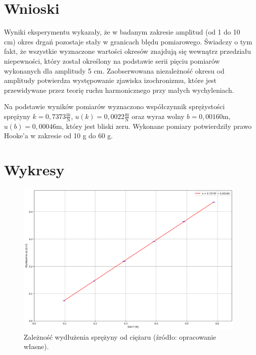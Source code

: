 \documentclass[a4paper,12pt]{article}
\begin{document}
\section{Wnioski}

Wyniki eksperymentu wykazały, że w badanym zakresie amplitud (od 1 do 10 cm) okres drgań pozostaje stały w granicach błędu pomiarowego. Świadczy o tym fakt, że wszystkie wyznaczone wartości okresów znajdują się wewnątrz przedziału niepewności, który został określony na podstawie serii pięciu pomiarów wykonanych dla amplitudy 5 cm. Zaobserwowana niezależność okresu od amplitudy potwierdza występowanie zjawiska izochronizmu, które jest przewidywane przez teorię ruchu harmonicznego przy małych wychyleniach.

Na podstawie wyników pomiarów wyznaczono współczynnik sprężystości sprężyny $k = 0{,}7373 \frac{\text{m}}{\text{N}}$, $u(k)= 0{,}0022 \frac{\text{m}}{\text{N}}$ oraz wyraz wolny $b = 0{,}00160 \text{m}$, $u(b)= 0{,}00046 \text{m}$, który jest bliski zeru. Wykonane pomiary potwierdziły prawo Hooke'a w zakresie od 10 g do 60 g.


\section{Wykresy}

\begin{figure}[H]
    \centering
    \includegraphics[width=1.2\linewidth,angle=90]{2-x(F).png}
    \caption{Zależność wydłużenia sprężyny od ciężaru (źródło: opracowanie własne).}
    \label{fig:zaleznosci}
\end{figure}




\end{document}
